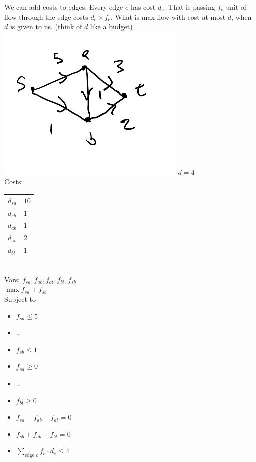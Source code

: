 \documentclass[12 pt]{article}
\begin{document}
        We can add costs to edges. Every edge $e$ has cost $d_e$. That
        is passing $f_e$ unit of flow through the edge costs $d_e
        \times f_e$. What is max flow with cost at most
        $d$, when $d$ is given to us. (think of $d$ like a budget)
        \\ \includegraphics[width=.9\textwidth]{i97.pdf}
        $d = 4$\\
        Costs:
        \begin{tabular}{l|l}
          $d_{sa}$& $10$
          \\ $d_{sb}$ & $1$
          \\ $d_{ab}$ & $1$
          \\ $d_{at}$ & $2$
          \\ $d_{bt}$ & $1$
        \end{tabular}
        \\ Vars: $f_{sa}, f_{ab}, f_{at}, f_{bt}, f_{sb}$
        \\ $\max f_{sa}+f_{sb}$
        \\ Subject to
        \begin{itemize}
        \item $f_{sa} \leq 5$
        \item \ldots
        \item $f_{sb} \leq 1$
        \item $f_{sa} \geq 0$
        \item \ldots
        \item $f_{bt} \geq 0$
        \item $f_{sa}-f_{ab}-f_{at} = 0$
        \item $f_{sb}+f_{ab}-f_{bt} = 0$
        \item $\sum_{\text{edge }e}f_e \cdot d_e \leq 4$
        \end{itemize}
\end{document}
